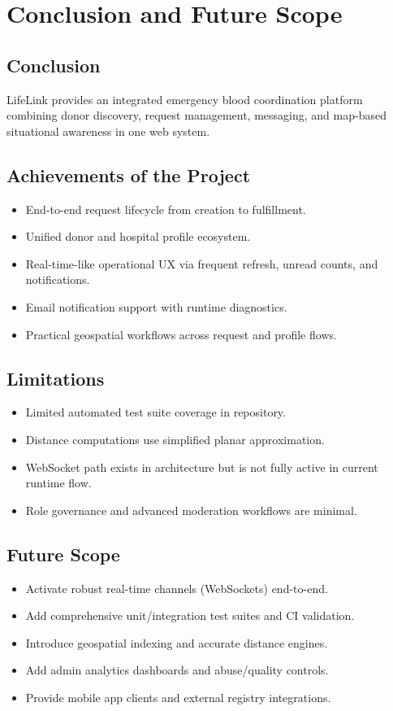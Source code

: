 \documentclass[12pt,a4paper]{report}
\begin{document}
\chapter{Conclusion and Future Scope}
\section{Conclusion}
LifeLink provides an integrated emergency blood coordination platform combining donor discovery, request management, messaging, and map-based situational awareness in one web system.

\section{Achievements of the Project}
\begin{itemize}[leftmargin=1.5em]
\item End-to-end request lifecycle from creation to fulfillment.
\item Unified donor and hospital profile ecosystem.
\item Real-time-like operational UX via frequent refresh, unread counts, and notifications.
\item Email notification support with runtime diagnostics.
\item Practical geospatial workflows across request and profile flows.
\end{itemize}

\section{Limitations}
\begin{itemize}[leftmargin=1.5em]
\item Limited automated test suite coverage in repository.
\item Distance computations use simplified planar approximation.
\item WebSocket path exists in architecture but is not fully active in current runtime flow.
\item Role governance and advanced moderation workflows are minimal.
\end{itemize}

\section{Future Scope}
\begin{itemize}[leftmargin=1.5em]
\item Activate robust real-time channels (WebSockets) end-to-end.
\item Add comprehensive unit/integration test suites and CI validation.
\item Introduce geospatial indexing and accurate distance engines.
\item Add admin analytics dashboards and abuse/quality controls.
\item Provide mobile app clients and external registry integrations.
\end{itemize}
\end{document}

